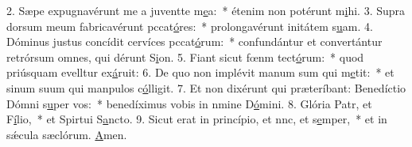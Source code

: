 2. Sæpe expugnavérunt me a juventte m\uline{e}a:~* étenim non potérunt m\uline{i}hi.
3. Supra dorsum meum fabricavérunt pccat\uline{ó}res:~* prolongavérunt initátem s\uline{u}am.
4. Dóminus justus concídit cervíces pccat\uline{ó}rum:~* confundántur et convertántur retrórsum omnes, qui dérunt S\uline{i}on.
5. Fiant sicut fœnm tect\uline{ó}rum:~* quod priúsquam evelltur ex\uline{á}ruit:
6. De quo non implévit manum sum qui m\uline{e}tit:~* et sinum suum qui manpulos c\uline{ó}lligit.
7. Et non dixérunt qui præteríbant: Benedíctio Dómni s\uline{u}per vos:~* benedíximus vobis in nmine D\uline{ó}mini.
8. Glória Patr, et F\uline{í}lio,~* et Spirtui S\uline{a}ncto.
9. Sicut erat in princípio, et nnc, et s\uline{e}mper,~* et in sǽcula sæclórum. \uline{A}men.
